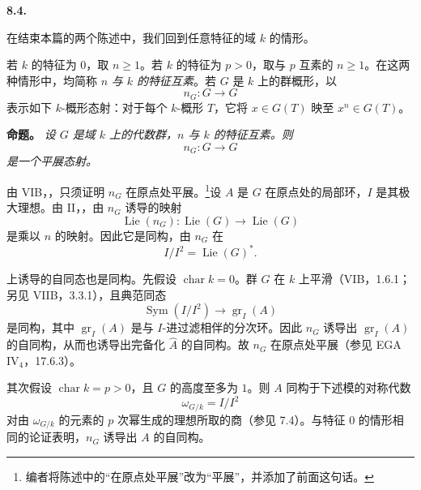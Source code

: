 
\medskip
\noindent\textbf{8.4.}
\label{sga3:VIIA:8.4}

在结束本篇的两个陈述中，我们回到任意特征的域 \(k\) 的情形。

若 \(k\) 的特征为 \(0\)，取 \(n\ge1\)。若 \(k\) 的特征为 \(p>0\)，取与 \(p\) 互素的 \(n\ge1\)。在这两种情形中，均简称 \(n\) \emph{与 \(k\) 的特征互素}。若 \(G\) 是 \(k\) 上的群概形，以
\[
  n_G:G\longrightarrow G
\]
表示如下 \(k\)-概形态射：对于每个 \(k\)-概形 \(T\)，它将 \(x\in G(T)\) 映至 \(x^n\in G(T)\)。

\medskip
\noindent\textbf{命题。}
\label{sga3:VIIA:8.4-proposition}
\textit{设 \(G\) 是域 \(k\) 上的代数群，\(n\) 与 \(k\) 的特征互素。则
\[
  n_G:G\longrightarrow G
\]
是一个平展态射。}

由 VIB，，只须证明 \(n_G\) 在原点处平展。\footnote{编者将陈述中的“在原点处平展”改为“平展”，并添加了前面这句话。}设 \(A\) 是 \(G\) 在原点处的局部环，\(I\) 是其极大理想。由 II，，由 \(n_G\) 诱导的映射
\[
  \operatorname{Lie}(n_G):
  \operatorname{Lie}(G)\longrightarrow\operatorname{Lie}(G)
\]
是乘以 \(n\) 的映射。因此它是同构，由 \(n_G\) 在
\[
  I/I^2=\operatorname{Lie}(G)^*.
\]

上诱导的自同态也是同构。先假设 \(\operatorname{char}k=0\)。群 \(G\) 在 \(k\) 上平滑（VIB，1.6.1；另见 VIIB，3.3.1），且典范同态
\[
  \operatorname{Sym}(I/I^2)\longrightarrow
  \operatorname{gr}_I(A)
\]
是同构，其中 \(\operatorname{gr}_I(A)\) 是与 \(I\)-进过滤相伴的分次环。因此 \(n_G\) 诱导出 \(\operatorname{gr}_I(A)\) 的自同构，从而也诱导出完备化 \(\widehat A\) 的自同构。故 \(n_G\) 在原点处平展（参见 EGA IV\(_4\)，17.6.3）。

其次假设 \(\operatorname{char}k=p>0\)，且 \(G\) 的高度至多为 \(1\)。则 \(A\) 同构于下述模的对称代数
\[
  \omega_{G/k}=I/I^2
\]
对由 \(\omega_{G/k}\) 的元素的 \(p\) 次幂生成的理想所取的商（参见 7.4）。与特征 \(0\) 的情形相同的论证表明，\(n_G\) 诱导出 \(A\) 的自同构。

